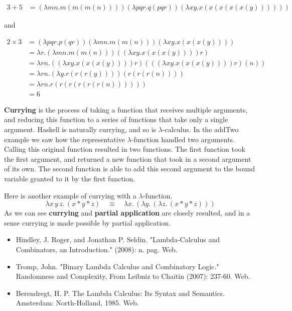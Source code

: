 \documentclass[12pt]{article}
\begin{document}
\begin{enumerate}
\begin{align*}
3 + 5 &= (\lambda mn.m(m(m(n)))) (\lambda pqr.q(pqr)) (\lambda xy.x(x(x(x(x(y))))))
\end{align*}

and

\begin{align*}
2 \times 3 &= (\lambda pqr.p(qr)) (\lambda mn.m(m(n))) (\lambda xy.x(x(x(y))))\\
&= \lambda r.(\lambda mn.m(m(n)))((\lambda xy.x(x(x(y))))r) \\
&= \lambda rn.((\lambda xy.x(x(x(y))))r)(((\lambda xy.x(x(x(y))))r)(n)) \\
&= \lambda rn.(\lambda y.r(r(r(y)))) (r(r(r(n)))) \\
&= \lambda rn.r(r(r(r(r(r(n))))))\\
&= 6
\end{align*}

\par
\textbf{Currying} is the process of taking a function that receives multiple arguments, and reducing this function to a series of functions that take only a single argument. Haskell is naturally currying, and so is $\lambda$-calculus. In the addTwo example we saw how the representative $\lambda$-function handled two arguments. Calling this original function resulted in two functions. The first function took the first argument, and returned a new function that took in a second argument of its own. The second function is able to add this second argument to the bound variable granted to it by the first function. \par Here is another example of currying with a $\lambda$-function.
$$\lambda x\,y\,z.\, (x * y * z) \quad \equiv \quad \lambda x.\,(\lambda y.\,(\lambda z.\, (x * y * z)))$$ 
As we can see \textbf{currying} and \textbf{partial application} are closely resulted, and in a sense currying is made possible by partial application.
\newline
\begin{itemize}
\item Hindley, J. Roger, and Jonathan P. Seldin. "Lambda-Calculus and Combinators, an Introduction." (2008): n. pag. Web.
\item Tromp, John. "Binary Lambda Calculus and Combinatory Logic." Randomness and Complexity, From Leibniz to Chaitin (2007): 237-60. Web.
\item Berendregt, H. P. The Lambda Calculus: Its Syntax and Semantics. Amsterdam: North-Holland, 1985. Web.
\end{itemize}
\end{enumerate}
\end{document}
